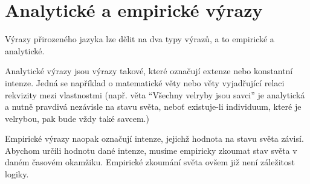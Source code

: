 \section{Analytické a empirické výrazy}

Výrazy přirozeného jazyka lze dělit na dva typy výrazů, a to empirické a analytické.

Analytické výrazy jsou výrazy takové, které označují extenze nebo konstantní intenze. Jedná se
například o matematické věty nebo věty vyjadřující relaci rekvizity mezi vlastnostmi (např. věta
``Všechny velryby jsou savci'' je analytická a nutně pravdivá nezávisle na stavu světa, neboť
existuje-li individuum, které je velrybou, pak bude vždy také savcem.)

Empirické výrazy naopak označují intenze, jejichž hodnota na stavu světa závisí. Abychom určili
hodnotu dané intenze, musíme empiricky zkoumat stav světa v daném časovém okamžiku. Empirické
zkoumání světa ovšem již není záležitost logiky.
\endinput

